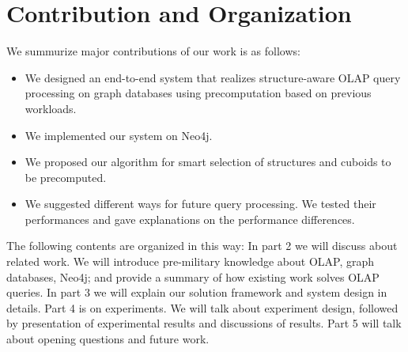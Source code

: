 \section{Contribution and Organization}
We summurize major contributions of our work is as follows:
\begin{itemize}
\item {We designed an end-to-end system that realizes structure-aware OLAP query processing on graph databases using precomputation based on previous workloads.}

\item We implemented our system on Neo4j.

\item We proposed our algorithm for smart selection of structures and cuboids to be precomputed.
 
\item We suggested different ways for future query processing. We tested their performances and gave explanations on the performance differences.
 
 \end{itemize}

The following contents are organized in this way:
In part 2 we will discuss about related work. We will introduce pre-military knowledge about  OLAP, graph databases, Neo4j; and provide a summary of how existing work solves OLAP queries.
In part 3 we will explain our solution framework and system design in details. 
Part 4 is on experiments. We will talk about experiment design, followed by presentation of experimental results and discussions of results.
Part 5 will talk about opening questions and future work.

